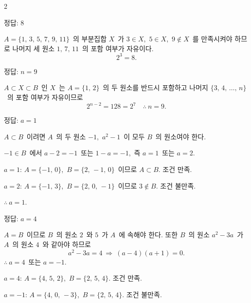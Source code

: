 \documentclass[10pt,fleqn]{article}
\begin{document}
\begin{multicols*}{2}

\begin{dmanswerbox}
정답: $8$
\end{dmanswerbox}

$A=\{1,\,3,\,5,\,7,\,9,\,11\}$\ 의 부분집합 $X$\ 가 $3\in X$,\ $5\in X$,\ $9\notin X$\ 를 만족시켜야 하므로 나머지 세 원소 $1,\,7,\,11$\ 의 포함 여부가 자유이다.
\[ 2^{3}=8. \]

\begin{dmanswerbox}
정답: $n=9$
\end{dmanswerbox}

$A\subset X\subset B$\ 인 $X$\ 는 $A=\{1,\,2\}$\ 의 두 원소를 반드시 포함하고 나머지 $\{3,\,4,\,\ldots,\,n\}$\ 의 포함 여부가 자유이므로
\[ 2^{n-2}=128=2^{7}\quad\therefore\ n=9. \]

\begin{dmanswerbox}
정답: $a=1$
\end{dmanswerbox}

$A\subset B$\ 이려면 $A$\ 의 두 원소 $-1$,\ $a^{2}-1$\ 이 모두 $B$\ 의 원소여야 한다.

$-1\in B$\ 에서 $a-2=-1$\ 또는 $1-a=-1$,\ 즉 $a=1$\ 또는 $a=2$.

\vspace{2mm}
$a=1$: $A=\{-1,\,0\}$,\ $B=\{2,\,-1,\,0\}$\ 이므로 $A\subset B$. 조건 만족.

$a=2$: $A=\{-1,\,3\}$,\ $B=\{2,\,0,\,-1\}$\ 이므로 $3\notin B$. 조건 불만족.

$\therefore\ a=1$.

\begin{dmanswerbox}
정답: $a=4$
\end{dmanswerbox}

$A=B$\ 이므로 $B$\ 의 원소 $2$\ 와 $5$\ 가 $A$\ 에 속해야 한다. 또한 $B$\ 의 원소 $a^{2}-3a$\ 가 $A$\ 의 원소 $4$\ 와 같아야 하므로
\[ a^{2}-3a=4\ \Longrightarrow\ (a-4)(a+1)=0. \]
$\therefore\ a=4$\ 또는 $a=-1$.

\vspace{2mm}
$a=4$: $A=\{4,\,5,\,2\}$,\ $B=\{2,\,5,\,4\}$. 조건 만족.

$a=-1$: $A=\{4,\,0,\,-3\}$,\ $B=\{2,\,5,\,4\}$. 조건 불만족.


\end{multicols*}
\end{document}
